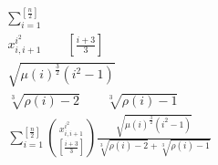 \documentclass[12pt]{amsbook}
\begin{document}
\begin{gather*}
    \sum_{i=1}^{\left[\frac{n}2\right]}
    \\
    x_{i,i+1}^{i^2}\qquad\left[\frac{i+3}{3}\right]
    \\
    \sqrt{\mu(i)^\frac{3}2(i^2-1)}
    \\
    \sqrt[3]{\rho(i)-2}\qquad\sqrt[3]{\rho(i)-1}
    \\
    \sum_{i=1}^{\left[\frac{n}{2}\right]}
    \binom{x_{i,i+1}^{i^2}}{\left[\frac{i+3}{3}\right]}
    \frac{\sqrt{\mu(i)^\frac{3}{2}(i^2-1)}}
        {\sqrt[3]{\rho(i)-2} + \sqrt[3]{\rho(i)-1}}
\end{gather*}
\end{document}
